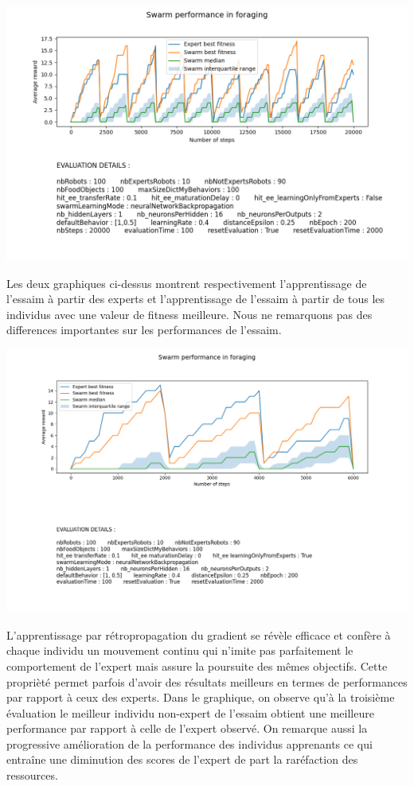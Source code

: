 \documentclass[a4paper, 12pt]{report}
\begin{document}
    \includegraphics[scale=0.5]{images/data_learnFromAll_20000_100_bp.png}
    
    Les deux graphiques ci-dessus montrent respectivement l'apprentissage de l'essaim à partir des experts et l'apprentissage de l'essaim à partir de tous les individus avec une valeur de fitness meilleure.
    Nous ne remarquons pas des differences importantes sur les performances de l'essaim.

    
    \includegraphics[scale=0.5]{bp6000_100.png}
    
    L'apprentissage par rétropropagation du gradient se révèle efficace et confère à chaque individu un mouvement continu qui n'imite pas parfaitement le comportement de l'expert mais assure la poursuite des mêmes objectifs. Cette proprièté permet parfois d'avoir des résultats meilleurs en termes de performances par rapport à ceux des experts. 
    Dans le graphique, on observe qu'à la troisième évaluation le meilleur individu non-expert de l'essaim obtient une meilleure performance par rapport à celle de l'expert observé. On remarque aussi la progressive amélioration de la performance des individus apprenants ce qui entraîne une diminution des scores de l'expert de part la raréfaction des ressources.
\end{document}

